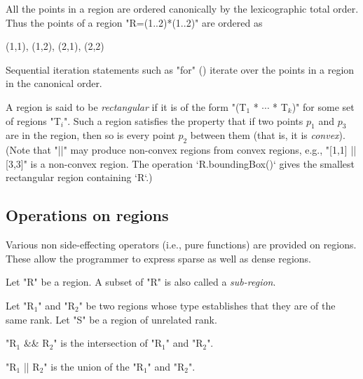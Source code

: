 All the points in a region are ordered canonically by the
lexicographic total order. Thus the points of a region \xcd"R=(1..2)*(1..2)"
are ordered as 
\begin{xten}
(1,1), (1,2), (2,1), (2,2)
\end{xten}
Sequential iteration statements such as \xcd"for" ()
iterate over the points in a region in the canonical order.

A region is said to be {\em rectangular} if it is of
the form \xcdmath"(T$_1$ * $\cdots$ * T$_k$)" for some set of regions
\xcdmath"T$_i$". Such a
region satisfies the property that if two points $p_1$ and $p_3$ are
in the region, then so is every point $p_2$ between them (that is, it is {\em convex}). 
(Note that \xcd"||" may produce non-convex regions from convex regions, e.g.,
\xcd"[1,1] || [3,3]" is a non-convex region.  The operation
\xcd`R.boundingBox()` gives the smallest rectangular region containing
\xcd`R`.)  






\subsection{Operations on regions}
Various non side-effecting operators (i.e., pure functions) are
provided on regions. These allow the programmer to express sparse as
well as dense regions.

Let \xcd"R" be a region. A subset of \xcd"R" is also called a
{\em sub-region}.

Let \xcdmath"R$_1$" and \xcdmath"R$_2$" be two regions whose type
establishes that they are of the same rank. Let 
\xcdmath"S" be a region of unrelated rank.

\xcdmath"R$_1$ && R$_2$" is the intersection of \xcdmath"R$_1$" and
\xcdmath"R$_2$". 


\xcdmath"R$_1$ || R$_2$" is the union of the \xcdmath"R$_1$" and
\xcdmath"R$_2$".

